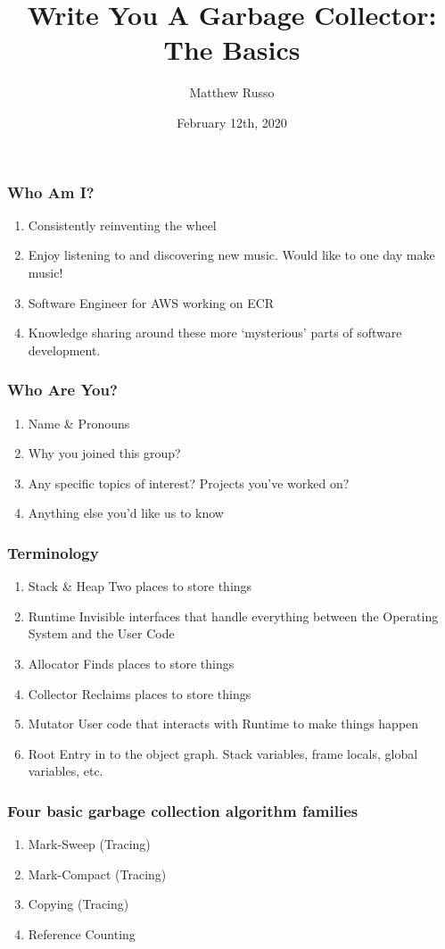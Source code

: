 \documentclass{beamer}
\title{Write You A Garbage Collector: The Basics}
\author{Matthew Russo}
\institute{Reinventing the Wheel}
\date{February 12th, 2020}
\begin{document}
 
\frame{\titlepage}

\begin{frame}
  \frametitle{Who Am I?}
  \begin{enumerate}
    \item Consistently reinventing the wheel
    \item Enjoy listening to and discovering new music. Would like to one day make music!
    \item Software Engineer for AWS working on ECR
    \item Knowledge sharing around these more `mysterious' parts of software development.
  \end{enumerate}
\end{frame}

\begin{frame}
  \frametitle{Who Are You?}
  \begin{enumerate}
    \item Name \& Pronouns
    \item Why you joined this group?
    \item Any specific topics of interest? Projects you've worked on?
    \item Anything else you'd like us to know
  \end{enumerate}
\end{frame}

\begin{frame}
  \frametitle{Terminology}
  \begin{enumerate}
    \item Stack \& Heap \textendash{} Two places to store things
    \item Runtime \textendash{} Invisible interfaces that handle everything between the Operating System and the User Code
    \item Allocator \textendash{} Finds places to store things
    \item Collector \textendash{} Reclaims places to store things
    \item Mutator \textendash{} User code that interacts with Runtime to make things happen
    \item Root \textendash{} Entry in to the object graph. Stack variables, frame locals, global variables, etc.
  \end{enumerate}
\end{frame}

\begin{frame}
  \frametitle{Four basic garbage collection algorithm families}
  \begin{enumerate}
    \item Mark-Sweep (Tracing)
    \item Mark-Compact (Tracing)
    \item Copying (Tracing)
    \item Reference Counting
  \end{enumerate}
\end{frame}
\end{document}
